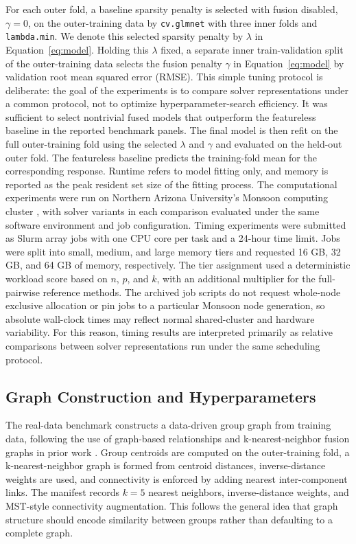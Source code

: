 \documentclass[twoside,11pt]{article}
\begin{document}
For each outer fold, a baseline sparsity penalty is selected with fusion
disabled, $\gamma=0$, on the outer-training data by \texttt{cv.glmnet} with
three inner folds and \texttt{lambda.min}. We denote this selected sparsity
penalty by $\lambda$ in Equation~\ref{eq:model}. Holding this $\lambda$ fixed,
a separate inner train-validation split of the outer-training data selects the
fusion penalty $\gamma$ in Equation~\ref{eq:model} by validation root mean
squared error (RMSE). This
simple tuning protocol is deliberate: the goal of the experiments is to
compare solver representations under a common protocol, not to optimize
hyperparameter-search efficiency. It was sufficient to select nontrivial fused
models that outperform the featureless baseline in the reported benchmark
panels. The final model is then refit on the full outer-training fold using
the selected $\lambda$ and $\gamma$ and evaluated on the held-out outer fold.
The featureless baseline predicts the training-fold mean for the corresponding
response. Runtime refers to model fitting only, and memory is reported as the
peak resident set size of the fitting process.
The computational experiments were run on Northern Arizona University's
Monsoon computing cluster \citep{nau_monsoon}, with solver variants in each
comparison evaluated under the same software environment and job
configuration. Timing experiments were submitted as Slurm array jobs with
one CPU core per task and a 24-hour time limit. Jobs were split into
small, medium, and large memory tiers and requested 16 GB, 32 GB, and 64 GB
of memory, respectively. The tier assignment used a deterministic workload
score based on $n$, $p$, and $k$, with an additional multiplier for the
full-pairwise reference methods. The archived job scripts do not request
whole-node exclusive allocation or pin jobs to a particular Monsoon node
generation, so absolute wall-clock times may reflect normal shared-cluster
and hardware variability. For this reason, timing results are interpreted
primarily as relative comparisons between solver representations run under
the same scheduling protocol.

\subsection{Graph Construction and Hyperparameters}

The real-data benchmark constructs a data-driven group graph from training
data, following the use of graph-based relationships and k-nearest-neighbor
fusion graphs in prior work \citep{hallac2015network,padilla2020adaptive}.
Group centroids are computed on the outer-training fold, a k-nearest-neighbor
graph is formed from centroid distances, inverse-distance weights are used,
and connectivity is enforced by adding nearest inter-component links.
The manifest records $k=5$ nearest neighbors, inverse-distance weights, and
MST-style connectivity augmentation. This follows the general idea that graph
structure should encode similarity between groups rather than defaulting to a
complete graph.
\end{document}
